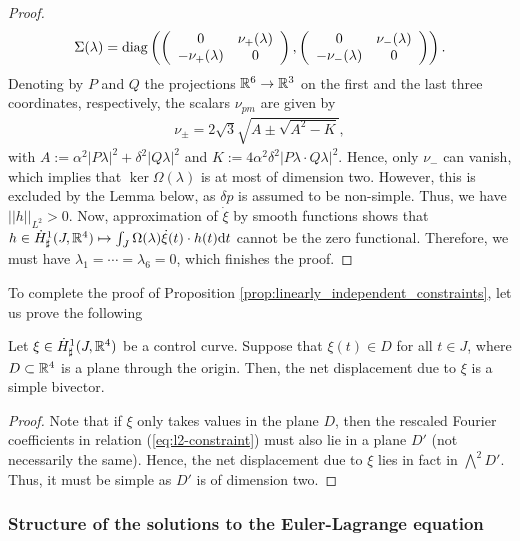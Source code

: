 \begin{proof}
\begin{align}
\Sigma(\lambda) = \operatorname{diag} \left (\left( \begin{array}{cc}
0 & \nu_+(\lambda) \\ 
- \nu_+ (\lambda) & 0
\end{array} \right ) , \left ( \begin{array}{cc}
0 & \nu_{-}(\lambda) \\ 
- \nu_{-}(\lambda) & 0
\end{array} \right ) \right ).
\end{align}
Denoting by $P$ and $Q$ the projections $\mathbb{R}^6 \to \mathbb{R}^3$ on the first and the last three coordinates, respectively, the scalars $\nu_{pm}$ are given by
\begin{align}
	\nu_{\pm} = 2 \sqrt{3} \sqrt{A \pm \sqrt{A^2 - K}},
\end{align}
with $A := \alpha^2 |P \lambda|^2 + \delta^2 |Q \lambda|^2$ and $K := 4 \alpha^2 \delta^2 |P\lambda \cdot Q \lambda|^2$. Hence, only $\nu_-$ can vanish, which implies that $\ker \Omega(\lambda)$ is at most of dimension two. However, this is excluded by the Lemma below, as $\delta p$ is assumed to be non-simple. Thus, we have $||h||_{L^2} > 0$. Now, approximation of $\dot{\xi}$ by smooth functions shows that $h \in \dot{H}^{1}_{\sharp}(J, \mathbb{R}^4) \mapsto \int_J \Omega(\lambda) \dot{\xi}(t) \cdot h(t) \mathrm{d}t$ cannot be the zero functional. Therefore, we must have $\lambda_1 = \dotsm = \lambda_6 = 0$, which finishes the proof.
\end{proof}

To complete the proof of Proposition \ref{prop:linearly_independent_constraints}, let us prove the following
\begin{lemma}
	Let $\xi \in \dot{H}^{1}_{\sharp}(J, \mathbb{R}^4)$ be a control curve. Suppose that $\xi(t) \in D$ for all $t \in J$, where $D \subset \mathbb{R}^4$ is a plane through the origin. Then, the net displacement due to $\xi$ is a simple bivector.
\end{lemma}

\begin{proof}
Note that if $\xi$ only takes values in the plane $D$, then the rescaled Fourier coefficients in relation (\ref{eq:l2-constraint}) must also lie in a plane $D'$ (not necessarily the same). Hence, the net displacement due to $\xi$ lies in fact in $\bigwedge^2 D'$. Thus, it must be simple as $D'$ is of dimension two.
\end{proof}

\subsubsection{Structure of the solutions to the Euler-Lagrange equation}

